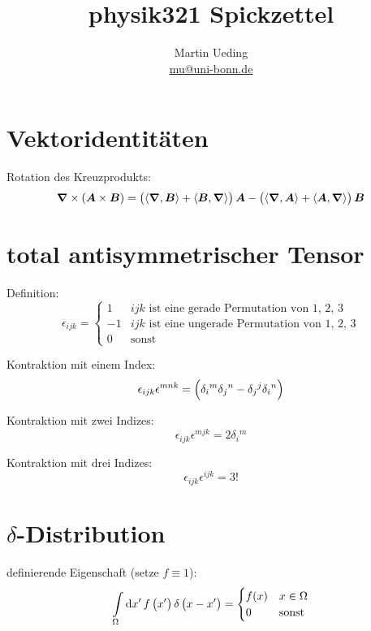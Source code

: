 

\hypersetup{
	pdftitle=
}


\title{physik321 Spickzettel}
\author{
	Martin Ueding \\
	\small{\href{mailto:mu@uni-bonn.de}{mu@uni-bonn.de}}
}



\section{Vektoridentitäten}

Rotation des Kreuzprodukts:
\[
	\vnabla \times \del{\vec A \times \vec B}
	= \del{\divergence{\vec B} + \inner{\vec B}\vnabla} \vec A
	- \del{\divergence{\vec A} + \inner{\vec A}\vnabla} \vec B
\]


\section{total antisymmetrischer Tensor}

Definition:
\[
	\epsilon_{ijk}
	=
	\begin{cases}
		1 & \text{$ijk$ ist eine gerade Permutation von 1, 2, 3} \\
		-1 & \text{$ijk$ ist eine ungerade Permutation von 1, 2, 3} \\
		0 & \text{sonst}
	\end{cases}
\]

Kontraktion mit einem Index:
\[
	\epsilon_{ijk} \epsilon^{mnk} = \del{
		\delta_i{}^m \delta_j{}^n - \delta_j{}^j \delta_i{}^n
	}
\]

Kontraktion mit zwei Indizes:
\[
	\epsilon_{ijk} \epsilon^{mjk} = 2 \delta_i{}^m
\]

Kontraktion mit drei Indizes:
\[
	\epsilon_{ijk} \epsilon^{ijk} = 3!
\]

\section{$\delta$-Distribution}

definierende Eigenschaft (setze $f \equiv 1$):
\[
	\intop_\Omega \dif x' \, f\del{x'} \delta\del{x - x'}
	=
	\begin{cases}
		f(x) & x \in \Omega \\
		0 & \text{sonst}
	\end{cases}
\]


